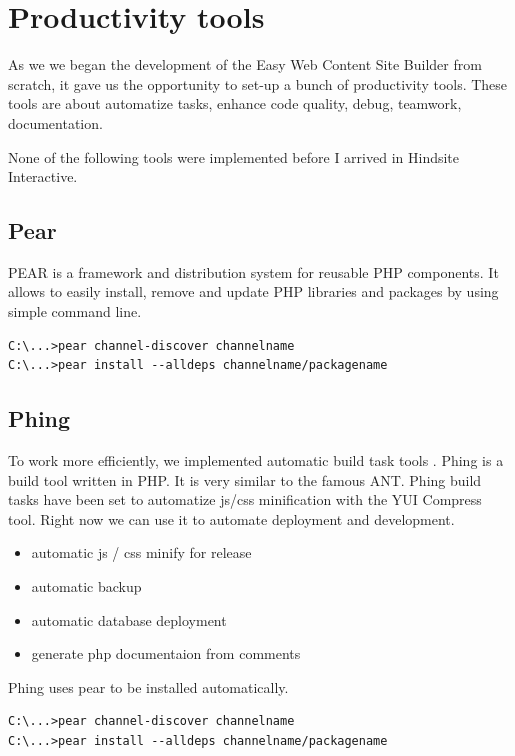 \chapter{Productivity tools}
As we we began the development of the Easy Web Content Site Builder from scratch, it gave us the opportunity to set-up a bunch of productivity tools. These tools are about automatize tasks, enhance code quality, debug, teamwork, documentation.

None of the following tools were implemented before I arrived in Hindsite Interactive. 
\section{Pear}

PEAR is a framework and distribution system for reusable PHP components. It allows to easily install, remove and update PHP libraries and packages by using simple command line.

\lstset{language=bash}
\begin{lstlisting}[label=pear-install,caption=Installation of pear packages]
C:\...>pear channel-discover channelname
C:\...>pear install --alldeps channelname/packagename
\end{lstlisting}

\section{Phing}

To work more efficiently, we implemented automatic build task tools . Phing is a build tool written in PHP. It is very similar to the famous ANT. Phing build tasks have been set to automatize js/css minification with the YUI Compress tool.
Right now we can use it to automate deployment and development.
\begin{itemize}
\item automatic js / css minify for release
\item automatic backup
\item automatic database deployment
\item generate php documentaion from comments
\end{itemize}

Phing uses pear to be installed automatically.

\lstset{language=bash}
\begin{lstlisting}[label=phing-install,caption=Installation of Phing]
C:\...>pear channel-discover channelname
C:\...>pear install --alldeps channelname/packagename
\end{lstlisting}

